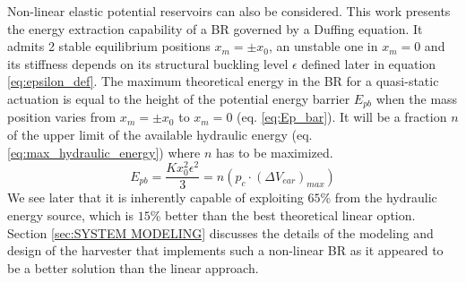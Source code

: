 \documentclass[3p,twocolumn,preprint]{elsarticle}
\begin{document}
Non-linear elastic potential reservoirs can also be considered. This work presents the energy extraction capability of a BR governed by a Duffing equation. It admits 2 stable equilibrium positions \mbox{$x_m=\pm x_0$}, an unstable one in \mbox{$x_m=0$} and its stiffness depends on its structural buckling level $\epsilon$ defined later in equation \ref{eq:epsilon_def}. The maximum theoretical energy in the BR for a quasi-static actuation is equal to the height of the potential energy barrier $E_{pb}$ when the mass position varies from \mbox{$x_m=\pm x_0$} to \mbox{$x_m=0$} (eq. \ref{eq:Ep_bar}). It will be a fraction $n$ of the upper limit of the available hydraulic energy (eq. \ref{eq:max_hydraulic_energy}) where $n$ has to be maximized. 
\begin{equation}
	E_{pb} = \dfrac{K x_0^2\epsilon^2}{3} = n(p_c \cdot (\Delta V_{ear})_{max})
	\label{eq:Ep_bar}
\end{equation}
We see later that it is inherently capable of exploiting $65$\% from the hydraulic energy source, which is $15$\% better than the best theoretical linear option. Section \ref{sec:SYSTEM MODELING} discusses the details of the modeling and design of the harvester that implements such a non-linear BR as it appeared to be a better solution than the linear approach. 
\end{document}
